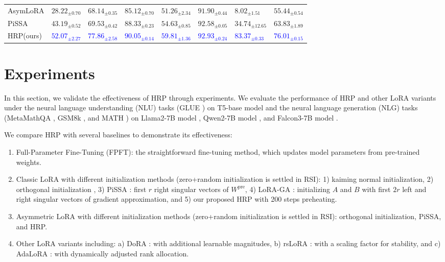 \begin{table*}
\begin{tabular}{llllllll}
AsymLoRA & $28.22_{\pm 0.70}$ & $68.14_{\pm 0.35}$ & $85.12_{\pm 0.70}$ & $51.26_{\pm 2.34}$ & $91.90_{\pm 0.44}$ & $8.02_{\pm 1.51}$ & $55.44_{\pm 0.54}$ \\
PiSSA & $43.19_{\pm 0.52}$ & $69.53_{\pm 0.42}$ & $88.33_{\pm 0.23}$ & $54.63_{\pm 0.85}$ & $92.58_{\pm 0.05}$ & $34.74_{\pm 12.65}$ & $63.83_{\pm 1.89}$ \\
HRP(ours) & \textcolor{blue}{$\mathbf{52.07_{\pm 2.27}}$} & \textcolor{blue}{$\mathbf{77.86_{\pm 2.58}}$} & \textcolor{blue}{$\mathbf{90.05_{\pm 0.14}}$} & \textcolor{blue}{$\mathbf{59.81_{\pm 1.36}}$} & \textcolor{blue}{$\mathbf{92.93_{\pm 0.24}}$} & \textcolor{blue}{$\mathbf{83.37_{\pm 0.33}}$} & \textcolor{blue}{$\mathbf{76.01_{\pm 0.15}}$} \\
\bottomrule
\end{tabular}


\end{table*}

\section{Experiments}
\label{exp}

In this section, we validate the effectiveness of HRP through experiments. We evaluate the performance of HRP and other LoRA variants under the neural language understanding (NLU) tasks (GLUE \cite{wang2018glue}) on T5-base model \cite{2020t5} and the neural language generation (NLG) tasks (MetaMathQA \cite{yu2023metamath}, GSM8k \cite{cobbe2021gsm8k}, and MATH \cite{hendrycks2021measuring}) on Llama2-7B model \cite{touvron2023llama}, Qwen2-7B model \cite{qwen2}, and Falcon3-7B model \cite{Falcon3}. 

We compare HRP with several baselines to demonstrate its effectiveness:
\begin{enumerate}
    \item Full-Parameter Fine-Tuning (FPFT): the straightforward fine-tuning method, which updates model parameters from pre-trained weights. 
    \item Classic LoRA with different initialization methods (zero+random initialization is settled in RSI): 1) kaiming normal initialization, 2) orthogonal initialization \cite{zhu2024asymmetry}, 3) PiSSA \cite{meng2024pissa}: first $r$ right singular vectors of $W^{\operatorname{pre}}$, 4) LoRA-GA \cite{wang2024lora}: initializing $A$ and $B$ with first $2r$ left and right singular vectors of gradient approximation, and 5) our proposed HRP with 200 steps preheating. 
    \item Asymmetric LoRA \cite{zhu2024asymmetry} with different initialization methods (zero+random initialization is settled in RSI): orthogonal initialization, PiSSA, and HRP. 
    \item Other LoRA variants including: a) DoRA \cite{liu2024dora}: with additional learnable magnitudes, b) rsLoRA \cite{kalajdzievski2023rank}: with a scaling factor for stability, and c) AdaLoRA \cite{zhang2023adalora}: with dynamically adjusted rank allocation. 
\end{enumerate}

